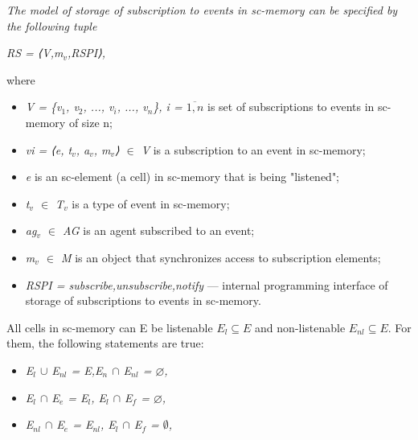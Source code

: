 \documentclass[10pt, a4paper]{article}
\begin{document}
\begin{multicols}{2}
\textit{The model of storage of subscription to events in sc-memory can be specified by the following tuple}
\begin{center}
    \textit{RS = ⟨V,m$_{v}$,RSPI⟩,}
\end{center}
where
\begin{itemize}
\setlength{\parskip}{0pt}
\setlength{\itemsep}{0pt}
    \item \textit{V = \{v$_{1}$, v$_{2}$, ..., v$_{i}$, ..., v$_{n}$\}, i = $\overline{1,  n}$} is set of
subscriptions to events in sc-memory of size n;
    \item \textit{vi = ⟨e, t$_{v}$, a$_{v}$, m$_{v}$⟩ $\in$ V} is a subscription to an
event in sc-memory;
    \item \textit{e} is an sc-element (a cell) in sc-memory that is being
"listened";
    \item  \textit{t$_{v}$ $\in$ T$_{v}$} is a type of event in sc-memory;
    \item  \textit{ag$_{v}$ $\in$ AG} is an agent subscribed to an event;
    \item  \textit{m$_{v}$ $\in$ M} is an object that synchronizes access to
subscription elements;
    \item \textit{RSPI = {subscribe,unsubscribe,notify}} — internal programming interface of storage of subscriptions to events in sc-memory.
    
\end{itemize}

All cells in sc-memory can E be listenable $E_{l} \subseteq E$
and non-listenable $E_{nl} \subseteq E$. For them, the following statements are true:

\begin{itemize}
\setlength{\parskip}{0pt}
\setlength{\itemsep}{0pt}
    \item \textit{E$_{l}$ $\cup$  E$_{nl}$ = E,E$_{n}$ $\cap$ E$_{nl}$ = $\varnothing$,}
    
    \item \textit{E$_{l}$ $\cap$ E$_{e}$ = E$_{l}$, E$_{l}$ $\cap$ E$_{f}$ = $\varnothing$,}
    
    \item \textit{E$_{nl}$ $\cap$ E$_{e}$ = E$_{nl}$, E$_{l}$ $\cap$ E$_{f}$ = $\emptyset$,}

    
\end{itemize}
\begin{center}


\end{center}
\end{multicols}
\end{document}
